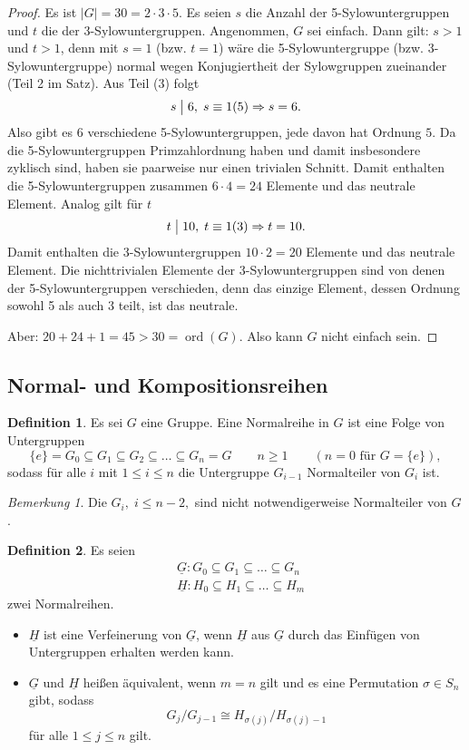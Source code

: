 \documentclass[12pt]{scrartcl} %
\DeclareMathOperator{\ord}{ord}
\newcommand{\divides}{\mathrel{\bigm|}}
\theoremstyle{definition}
\newtheorem*{defn}{Definition}
\theoremstyle{remark}
\newtheorem*{nb}{Bemerkung}
\begin{document}
\begin{proof}
	Es ist $|G| = 30 = 2\cdot 3\cdot 5$. Es seien $s$ die Anzahl der 5-Sylowuntergruppen und $t$ die der 3-Sylowuntergruppen. Angenommen, $G$ sei einfach. Dann gilt: $s>1$ und $t>1$, denn mit $s=1$ (bzw. $t=1$) wäre die 5-Sylowuntergruppe (bzw. 3-Sylowuntergruppe) normal wegen Konjugiertheit der Sylowgruppen zueinander (Teil 2 im Satz). Aus Teil (3) folgt
		\[ s \divides 6,\; s\equiv 1(5)\Rightarrow s=6.\]
	Also gibt es 6 verschiedene 5-Sylowuntergruppen, jede davon hat Ordnung $5$. Da die 5-Sylowuntergruppen Primzahlordnung haben und damit insbesondere zyklisch sind, haben sie paarweise nur einen trivialen Schnitt. Damit enthalten die 5-Sylowuntergruppen zusammen $6\cdot 4 =24$ Elemente und das neutrale Element. Analog gilt für $t$
		\[ t \divides 10,\; t\equiv 1(3) \Rightarrow t=10.\]
	Damit enthalten die 3-Sylowuntergruppen $10\cdot 2=20$ Elemente und das neutrale Element. Die nichttrivialen Elemente der 3-Sylowuntergruppen sind von denen der 5-Sylowuntergruppen verschieden, denn das einzige Element, dessen Ordnung sowohl 5 als auch 3 teilt, ist das neutrale.
	
	Aber: $20+24+1=45>30=\ord(G)$. Also kann $G$ nicht einfach sein.
\end{proof}

\subsection{Normal- und Kompositionsreihen}

\begin{defn}
	Es sei $G$ eine Gruppe. Eine Normalreihe in $G$ ist eine Folge von Untergruppen
		\[ \{e\} = G_0 \subseteq G_1 \subseteq G_2 \subseteq\dots\subseteq G_n=G\qquad n\geq 1\qquad(n=0\text{ für } G=\{e\}),\]
	sodass für alle $i$ mit $1\leq i\leq n$ die Untergruppe $G_{i-1}$ Normalteiler von $G_i$ ist.
\end{defn}

\begin{nb}
	Die $G_i,\;i\leq n-2,$ sind nicht notwendigerweise Normalteiler von $G$.
\end{nb}

\begin{defn}
	Es seien 
		\[\begin{split}
			&\underline{G}: G_0\subseteq G_1 \subseteq\dots\subseteq G_n \\
			&\underline{H}: H_0\subseteq H_1\subseteq\dots\subseteq H_m 
		\end{split}\]
	zwei Normalreihen.
	\begin{itemize}
		\item $\underline{H}$ ist eine Verfeinerung von $\underline{G}$, wenn $\underline{H}$ aus $\underline{G}$ durch das Einfügen von Untergruppen erhalten werden kann.
		\item $\underline{G}$ und $\underline{H}$ heißen äquivalent, wenn $m=n$ gilt und es eine Permutation $\sigma\in S_n$ gibt, sodass 
		\[ G_j/G_{j-1}\cong H_{\sigma(j)}/H_{\sigma(j)-1}\]
			für alle $1\leq j\leq n$ gilt.
	\end{itemize}
\end{defn}
\end{document}
